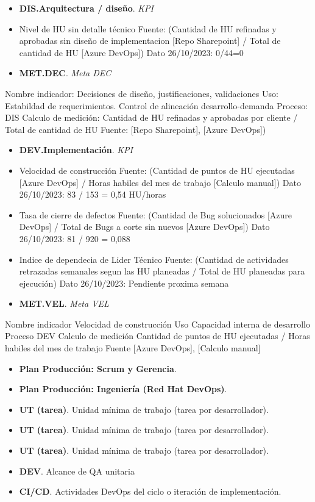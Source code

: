 \documentclass[
  paper=a4,
  ,captions=tableheading
]{scrartcl}
\begin{document}
\begin{itemize}
\item
  \textbf{DIS.Arquitectura / diseño}. \emph{KPI}
\item
  Nivel de HU sin detalle técnico Fuente: (Cantidad de HU refinadas y
  aprobadas sin diseño de implementacion {[}Repo Sharepoint{]} / Total
  de cantidad de HU {[}Azure DevOps{]}) Dato 26/10/2023: 0/44=0
\item
  \textbf{MET.DEC}. \emph{Meta DEC}
\end{itemize}

Nombre indicador: Decisiones de diseño, justificaciones, validaciones
Uso: Estabildad de requerimientos. Control de alineación
desarrollo-demanda Proceso: DIS Calculo de medición: Cantidad de HU
refinadas y aprobadas por cliente / Total de cantidad de HU Fuente:
{[}Repo Sharepoint{]}, {[}Azure DevOps{]})

\begin{itemize}
\item
  \textbf{DEV.Implementación}. \emph{KPI}
\item
  Velocidad de construcción Fuente: (Cantidad de puntos de HU ejecutadas
  {[}Azure DevOps{]} / Horas habiles del mes de trabajo {[}Calculo
  manual{]}) Dato 26/10/2023: 83 / 153 = 0,54 HU/horas
\item
  Tasa de cierre de defectos Fuente: (Cantidad de Bug solucionados
  {[}Azure DevOps{]} / Total de Bugs a corte sin nuevos {[}Azure
  DevOps{]}) Dato 26/10/2023: 81 / 920 = 0,088
\item
  Indice de dependecia de Lider Técnico Fuente: (Cantidad de actividades
  retrazadas semanales segun las HU planeadas / Total de HU planeadas
  para ejecución) Dato 26/10/2023: Pendiente proxima semana
\item
  \textbf{MET.VEL}. \emph{Meta VEL}
\end{itemize}

Nombre indicador Velocidad de construcción Uso Capacidad interna de
desarrollo Proceso DEV Calculo de medición Cantidad de puntos de HU
ejecutadas / Horas habiles del mes de trabajo Fuente {[}Azure DevOps{]},
{[}Calculo manual{]}

\begin{itemize}
\item
  \textbf{Plan Producción: Scrum y Gerencia}.
\item
  \textbf{Plan Producción: Ingeniería (Red Hat DevOps)}.
\item
  \textbf{UT (tarea)}. Unidad mínima de trabajo (tarea por
  desarrollador).
\item
  \textbf{UT (tarea)}. Unidad mínima de trabajo (tarea por
  desarrollador).
\item
  \textbf{UT (tarea)}. Unidad mínima de trabajo (tarea por
  desarrollador).
\item
  \textbf{DEV}. Alcance de QA unitaria
\item
  \textbf{CI/CD}. Actividades DevOps del ciclo o iteración de
  implementación.
\end{itemize}
\end{document}
